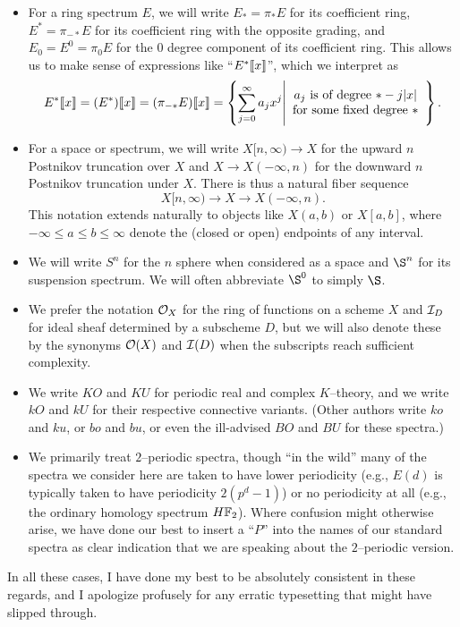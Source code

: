 \begin{itemize}
\item For a ring spectrum $E$, we will write $E_* = \pi_* E$ for its coefficient ring, $E^* = \pi_{-*} E$ for its coefficient ring with the opposite grading, and $E_0 = E^0 = \pi_0 E$ for the $0${\th} degree component of its coefficient ring.  This allows us to make sense of expressions like ``$E^*\llbracket{x}\rrbracket$'', which we interpret as \[E^*\llbracket{x}\rrbracket = (E^*)\llbracket{x}\rrbracket = (\pi_{-*} E)\llbracket{x}\rrbracket = \left\{ \sum_{j=0}^\infty a_j x^j \middle| \begin{array}{c} \text{$a_j$ is of degree $* -j|x|$} \\ \text{for some fixed degree $*$} \end{array} \right\}.\]
\item For a space or spectrum, we will write $X[n, \infty) \to X$ for the upward $n${\th} Postnikov truncation over $X$ and $X \to X(-\infty, n)$ for the downward $n${\th} Postnikov truncation under $X$.  There is thus a natural fiber sequence \[X[n, \infty) \to X \to X(-\infty, n).\]  This notation extends naturally to objects like $X(a, b)$ or $X[a, b]$, where $-\infty \le a \le b \le \infty$ denote the (closed or open) endpoints of any interval.
\item We will write $S^n$ for the $n${\th} sphere when considered as a space and $\S^n$ for its suspension spectrum.  We will often abbreviate $\S^0$ to simply $\S$.
\item We prefer the notation $\mathcal{O}_X$ for the ring of functions on a scheme $X$ and $\mathcal{I}_D$ for ideal sheaf determined by a subscheme $D$, but we will also denote these by the synonyms $\mathcal{O}(X)$ and $\mathcal{I}(D)$ when the subscripts reach sufficient complexity.
\item We write $KO$ and $KU$ for periodic real and complex $K$--theory, and we write $kO$ and $kU$ for their respective connective variants.  (Other authors write $ko$ and $ku$, or $bo$ and $bu$, or even the ill-advised $BO$ and $BU$ for these spectra.)
\item We primarily treat \(2\)--periodic spectra, though ``in the wild'' many of the spectra we consider here are taken to have lower periodicity (e.g., \(E(d)\) is typically taken to have periodicity \(2(p^d-1)\)) or no periodicity at all (e.g., the ordinary homology spectrum \(\HFtwo\)).  Where confusion might otherwise arise, we have done our best to insert a ``\(P\)'' into the names of our standard spectra as clear indication that we are speaking about the \(2\)--periodic version.
\end{itemize}

\noindent In all these cases, I have done my best to be absolutely consistent in these regards, and I apologize profusely for any erratic typesetting that might have slipped through.
